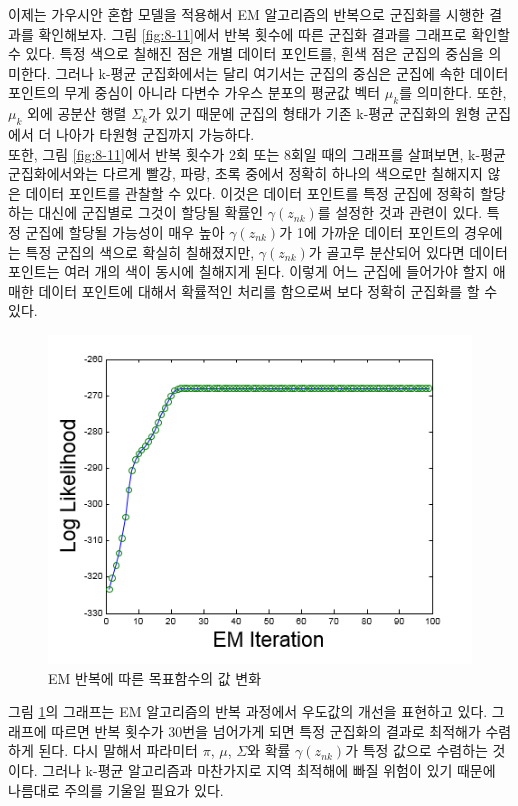 \documentclass[a4paper]{oblivoir}
\begin{document}
이제는 가우시안 혼합 모델을 적용해서 EM 알고리즘의 반복으로 군집화를 시행한 결과를 확인해보자. 그림 \ref{fig:8-11}에서 반복 횟수에 따른 군집화 결과를 그래프로 확인할 수 있다. 특정 색으로 칠해진 점은 개별 데이터 포인트를, 흰색 점은 군집의 중심을 의미한다. 그러나 k-평균 군집화에서는 달리 여기서는 군집의 중심은 군집에 속한 데이터 포인트의 무게 중심이 아니라 다변수 가우스 분포의 평균값 벡터 $\mu_k$를 의미한다. 또한, $\mu_k$ 외에 공분산 행렬 $\Sigma_k$가 있기 때문에 군집의 형태가 기존 k-평균 군집화의 원형 군집에서 더 나아가 타원형 군집까지 가능하다. \\

또한, 그림 \ref{fig:8-11}에서 반복 횟수가 2회 또는 8회일 때의 그래프를 살펴보면, k-평균 군집화에서와는 다르게 빨강, 파랑, 초록 중에서 정확히 하나의 색으로만 칠해지지 않은 데이터 포인트를 관찰할 수 있다. 이것은 데이터 포인트를 특정 군집에 정확히 할당하는 대신에 군집별로 그것이 할당될 확률인 $\gamma(z_{nk})$를 설정한 것과 관련이 있다. 특정 군집에 할당될 가능성이 매우 높아 $\gamma(z_{nk})$가 1에 가까운 데이터 포인트의 경우에는 특정 군집의 색으로 확실히 칠해졌지만, $\gamma(z_{nk})$가 골고루 분산되어 있다면 데이터 포인트는 여러 개의 색이 동시에 칠해지게 된다. 이렇게 어느 군집에 들어가야 할지 애매한 데이터 포인트에 대해서 확률적인 처리를 함으로써 보다 정확히 군집화를 할 수 있다. \\

\begin{figure}[ht] \centering 
\includegraphics[scale=1.0]{fig8_12.png} 
\caption{EM 반복에 따른 목표함수의 값 변화}
\label{fig:8-12}
\end{figure} 

그림 \ref{fig:8-12}의 그래프는 EM 알고리즘의 반복 과정에서 우도값의 개선을 표현하고 있다. 그래프에 따르면 반복 횟수가 30번을 넘어가게 되면 특정 군집화의 결과로 최적해가 수렴하게 된다. 다시 말해서 파라미터 $\pi$, ${\mu}$, ${\Sigma}$와 확률 $\gamma(z_{nk})$가 특정 값으로 수렴하는 것이다. 그러나 k-평균 알고리즘과 마찬가지로 지역 최적해에 빠질 위험이 있기 때문에 나름대로 주의를 기울일 필요가 있다. \\  
\end{document}
